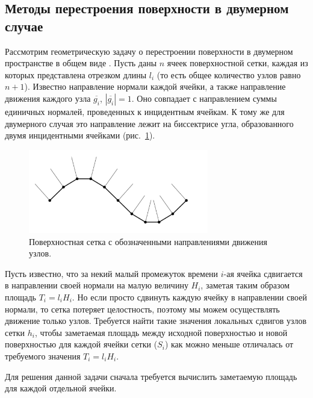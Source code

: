 \subsection{Методы перестроения поверхности в двумерном случае}

Рассмотрим геометрическую задачу о перестроении поверхности в двумерном пространстве в общем виде \cite{Rybakov2019Geo2D}.
Пусть даны $n$ ячеек поверхностной сетки, каждая из которых представлена отрезком длины $l_i$ (то есть общее количество узлов равно $n + 1$).
Известно направление нормали каждой ячейки, а также направление движения каждого узла $\overline{g_i}$, $|\overline{g_i}| = 1$.
Оно совпадает с направлением суммы единичных нормалей, проведенных к инцидентным ячейкам.
К тому же для двумерного случая это направление лежит на биссектрисе угла, образованного двумя инцидентными ячейками \cite{Fortin2004Remesh2d} (рис.~\ref{fig:text_1_remesh_2d_grid_normals}).

\begin{figure}[h]
\centering
\includegraphics[width=0.7\textwidth]{pics/text_1_remesh_2d/grid_normals.pdf}
\caption{Поверхностная сетка с обозначенными направлениями движения узлов.}
\label{fig:text_1_remesh_2d_grid_normals}
\end{figure}

Пусть известно, что за некий малый промежуток времени $i$-ая ячейка сдвигается в направлении своей нормали на малую величину $H_i$, заметая таким образом площадь $T_i = l_i H_i$.
Но если просто сдвинуть каждую ячейку в направлении своей нормали, то сетка потеряет целостность, поэтому мы можем осуществлять движение только узлов.
Требуется найти такие значения локальных сдвигов узлов сетки $h_i$, чтобы заметаемая площадь между исходной поверхностью и новой поверхностью для каждой ячейки сетки ($S_i$) как можно меньше отличалась от требуемого значения $T_i = l_iH_i$.

Для решения данной задачи сначала требуется вычислить заметаемую площадь для каждой отдельной ячейки.

